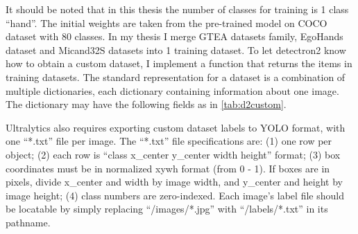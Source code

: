 It should be noted that in this thesis the number of classes for training is 1 class “hand”. The initial weights are taken from the pre-trained model on COCO dataset with 80 classes. In my thesis I merge GTEA datasets family, EgoHands dataset and Micand32S datasets into 1 training dataset. To let detectron2 know how to obtain a custom dataset, I implement a function that returns the items in training datasets. The standard representation for a dataset is a combination of multiple dictionaries, each dictionary containing information about one image. The dictionary may have the following fields as in \ref{tab:d2custom}.

Ultralytics also requires exporting custom dataset labels to YOLO format, with one “*.txt” file per image. The “*.txt” file specifications are: (1) one row per object; (2) each row is “class x\_center y\_center width height” format; (3) box coordinates must be in normalized xywh format (from 0 - 1). If boxes are in pixels, divide x\_center and width by image width, and y\_center and height by image height; (4) class numbers are zero-indexed. Each image's label file should be locatable by simply replacing “/images/*.jpg” with “/labels/*.txt” in its pathname.

